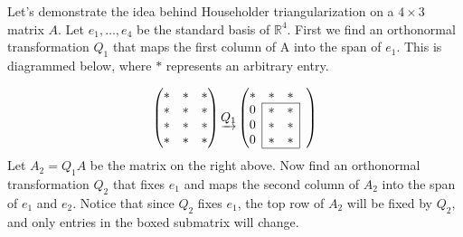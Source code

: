 Let's demonstrate the idea behind Householder triangularization on a $4 \times 3$ matrix $A$.
Let $e_1, \ldots, e_4$ be the standard basis of $\mathbb{R}^4$.
First we find an orthonormal transformation $Q_1$ that maps the first column of A into the span of $e_1$. 
This is diagrammed below, where $*$ represents an arbitrary entry.

\def\mc#1{\multicolumn{1}{c|}{#1}}
\def\lc#1{\multicolumn{1}{|c}{#1}}
\begin{equation*}
\begin{pmatrix}
* & * & * \\
* & * & * \\
* & * & * \\
* & * & *
\end{pmatrix}
\underrightarrow{Q_1}
\begin{pmatrix}

* & * & * & \\ \cline{2-3}
\mc{0} & * & \mc{*}& \\
\mc{0} & * & \mc{*} & \\
\mc{0}& * & \mc{*} & \\ \cline{2-3}
\end{pmatrix}
\end{equation*}
Let $A_2 = Q_1A$ be the matrix on the right above.
Now find an orthonormal transformation $Q_2$ that fixes $e_1$ and maps the second column of $A_2$ into the span of $e_1$ and $e_2$. 
Notice that since $Q_2$ fixes $e_1$, the top row of $A_2$ will be fixed by $Q_2$, and only entries in the boxed submatrix will change.

%
%

